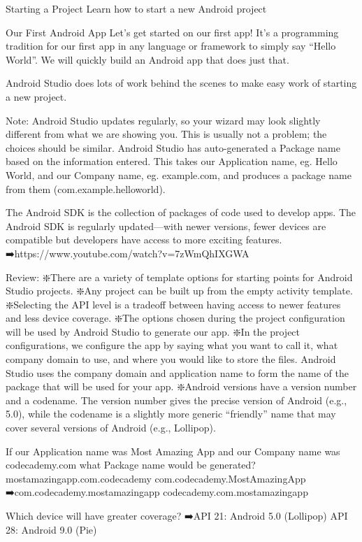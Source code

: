 Starting a Project
        Learn how to start a new Android project

Our First Android App
        Let’s get started on our first app! It’s a programming tradition for our first app in any language or framework to simply say “Hello World”. We will quickly build an Android app that does just that.

        Android Studio does lots of work behind the scenes to make easy work of starting a new project.

        Note: Android Studio updates regularly, so your wizard may look slightly different from what we are showing you. This is usually not a problem; the choices should be similar. Android Studio has auto-generated a Package name based on the information entered. This takes our Application name, eg. Hello World, and our Company name, eg. example.com, and produces a package name from them (com.example.helloworld).

        The Android SDK is the collection of packages of code used to develop apps. The Android SDK is regularly updated—with newer versions, fewer devices are compatible but developers have access to more exciting features.
        ➡️https://www.youtube.com/watch?v=7zWmQhIXGWA

        Review:
            ❇️There are a variety of template options for starting points for Android Studio projects.
            ❇️Any project can be built up from the empty activity template.
            ❇️Selecting the API level is a tradeoff between having access to newer features and less device coverage.
            ❇️The options chosen during the project configuration will be used by Android Studio to generate our app.
            ❇️In the project configurations, we configure the app by saying what you want to call it, what company domain to use, and where you would like to store the files. Android Studio uses the company domain and application name to form the name of the package that will be used for your app.
            ❇️Android versions have a version number and a codename. The version number gives the precise version of Android (e.g., 5.0), while the codename is a slightly more generic “friendly” name that may cover several versions of Android (e.g., Lollipop).

        If our Application name was Most Amazing App and our Company name was codecademy.com what Package name would be generated?
            mostamazingapp.com.codecademy
            com.codecademy.MostAmazingApp
            ➡️com.codecademy.mostamazingapp
            codecademy.com.mostamazingapp

        Which device will have greater coverage?
            ➡️API 21: Android 5.0 (Lollipop)
            API 28: Android 9.0 (Pie)